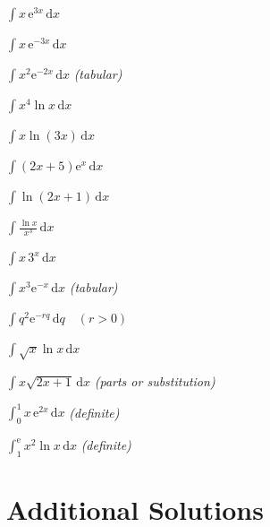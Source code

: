 \begin{problems}
  \item $\displaystyle\int x\,\mathrm{e}^{3x}\,\mathrm{d}x$
  \item $\displaystyle\int x\,\mathrm{e}^{-3x}\,\mathrm{d}x$
  \item $\displaystyle\int x^{2}\mathrm{e}^{-2x}\,\mathrm{d}x$
        \quad \emph{(tabular)}
  \item $\displaystyle\int x^{4}\ln x\,\mathrm{d}x$
  \item $\displaystyle\int x\ln(3x)\,\mathrm{d}x$
  \item $\displaystyle\int (2x+5)\mathrm{e}^{x}\,\mathrm{d}x$
  \item $\displaystyle\int \ln(2x+1)\,\mathrm{d}x$
  \item $\displaystyle\int \frac{\ln x}{x^{3}}\,\mathrm{d}x$
  \item $\displaystyle\int x\,3^{x}\,\mathrm{d}x$
  \item $\displaystyle\int x^{3}\mathrm{e}^{-x}\,\mathrm{d}x$
        \quad \emph{(tabular)}
  \item $\displaystyle\int q^{2}\mathrm{e}^{-rq}\,\mathrm{d}q \quad (r>0)$
  \item $\displaystyle\int \sqrt{x}\ln x\,\mathrm{d}x$
  \item $\displaystyle\int x\sqrt{2x+1}\,\mathrm{d}x$
        \quad \emph{(parts or substitution)}
  \item $\displaystyle\int_{0}^{1} x\,\mathrm{e}^{2x}\,\mathrm{d}x$
        \quad \emph{(definite)}
  \item $\displaystyle\int_{1}^{\mathrm{e}} x^{2}\ln x\,\mathrm{d}x$
        \quad \emph{(definite)}
\end{problems}

\section{Additional Solutions}

